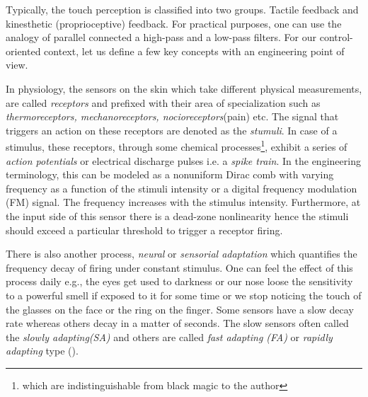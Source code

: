 Typically, the touch perception is classified into two groups. Tactile feedback and kinesthetic (proprioceptive) feedback. For practical purposes, one can use the analogy of parallel connected a high-pass and a low-pass filters. For our control-oriented context, let us define a few key concepts with an engineering point of view. 

In physiology, the sensors on the skin which take different physical measurements, are called \emph{receptors} and prefixed with their area of specialization such as \emph{thermoreceptors, mechanoreceptors, nocioreceptors}(pain) etc. The signal that triggers an action on these receptors are denoted as the \emph{stumuli}. In case of a stimulus, these receptors, through some chemical processes\footnote{which are indistinguishable from black magic to the author}, exhibit a series of \emph{action potentials} or electrical discharge pulses i.e. a \emph{spike train}. In the engineering terminology, this can be modeled as a nonuniform Dirac comb with varying frequency as a function of the stimuli intensity or a digital frequency modulation (FM) signal. The frequency increases with the stimulus intensity. Furthermore, at the input side of this sensor there is a dead-zone nonlinearity hence the stimuli should exceed a particular threshold to trigger a receptor firing.

There is also another process, \emph{neural} or \emph{sensorial adaptation} which quantifies the frequency decay of firing under constant stimulus. One can feel the effect of this process daily e.g., the eyes get used to darkness or our nose loose the sensitivity to a powerful smell if exposed to it for some time or we stop noticing the touch of the glasses on the face or the ring on the finger. Some sensors have a slow decay rate whereas others decay in a matter of seconds. The slow sensors often called the \emph{slowly adapting(SA)} and others are called \emph{fast adapting (FA)} or \emph{rapidly adapting} type (\cite{burdea}).


